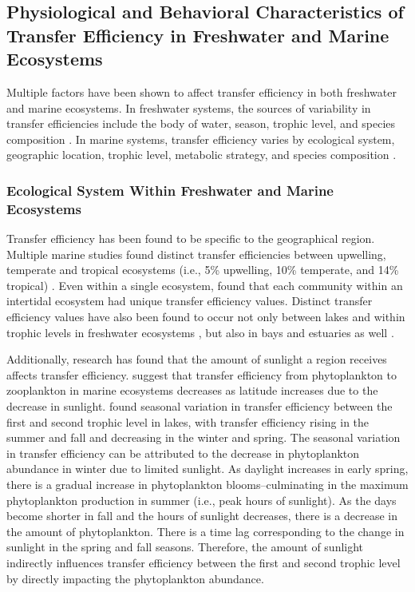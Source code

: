 \documentclass[oneside,12pt,final]{sty/ucthesis-CA2012}
\let\cite\citep                             %
\begin{document}
\begin{mainmatter}
\subsection{Physiological and Behavioral Characteristics of Transfer Efficiency in Freshwater and Marine Ecosystems}
Multiple factors have been shown to affect transfer efficiency in both freshwater and marine ecosystems. In freshwater systems, the sources of variability in transfer efficiencies include the body of water, season, trophic level, and species composition \cite{lindeman1942trophic, gaedke1994seasonal, rybarczyk2003analysis, karlsson2007differences}.
In marine systems, transfer efficiency varies by ecological system, geographic location, trophic level, metabolic strategy, and species composition \cite{may1983ecology, persson2007food, libralato2008novel, barnes2010global}.

\subsubsection{Ecological System Within Freshwater and Marine Ecosystems}
Transfer efficiency has been found to be specific to the geographical region. Multiple marine studies found distinct transfer efficiencies between upwelling, temperate and tropical ecosystems (i.e., 5\% upwelling, 10\% temperate, and 14\% tropical) \cite{libralato2008novel, coll2008ecosystem, chassot2010global}. Even within a single ecosystem,
\citet{baird2004energy} found that each community within an intertidal ecosystem had unique transfer efficiency values. Distinct transfer efficiency values have also been found to occur not only between lakes and within trophic levels in freshwater ecosystems \cite{lindeman1942trophic}, but also in bays and estuaries as well \cite{rybarczyk2003analysis}.

\vspace{5mm}

Additionally, research has found that the amount of sunlight a region receives affects transfer efficiency. \citet{sanmartin2006latitudinal} suggest that transfer efficiency from phytoplankton to zooplankton in marine ecosystems decreases as latitude increases due to the decrease in sunlight. \citet{gaedke1994seasonal} found seasonal variation in transfer efficiency between the first and second trophic level in lakes, with transfer efficiency rising in the summer and fall and decreasing in the winter and spring. The seasonal variation in transfer efficiency can be attributed to the decrease in phytoplankton abundance in winter due to limited sunlight. As daylight increases in early spring, there is a gradual increase in phytoplankton blooms--culminating in the maximum phytoplankton production in summer (i.e., peak hours of sunlight).  As the days become shorter in fall and the hours of sunlight decreases, there is a decrease in the amount of phytoplankton. There is a time lag corresponding to the change in sunlight in the spring and fall seasons. Therefore, the amount of sunlight indirectly influences transfer efficiency between the first and second trophic level by directly impacting the phytoplankton abundance. 


\end{mainmatter}
\end{document}
